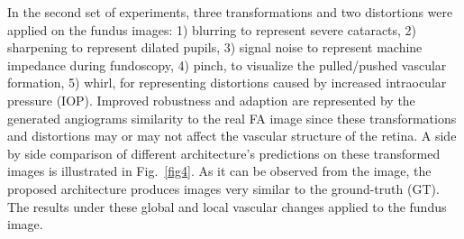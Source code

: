 \documentclass[a4paper,conference]{IEEEtran}
\begin{document}
In the second set of experiments, three transformations and two distortions were applied on the fundus images: 1) blurring to represent severe cataracts, 2) sharpening to represent dilated pupils, 3) signal noise to represent machine impedance during fundoscopy, 4) pinch, to visualize the pulled/pushed vascular formation, 5) whirl, for representing distortions caused by increased intraocular pressure (IOP). Improved robustness and adaption are represented by the generated angiograms similarity to the real FA image since these transformations and distortions may or may not affect the vascular structure of the retina. A side by side comparison of different architecture's predictions on these transformed images is illustrated in Fig.~\ref{fig4}. As it can be observed from the image, the proposed architecture produces images very similar to the ground-truth (GT). The results under these global and local vascular changes applied to the fundus image. 
\end{document}
